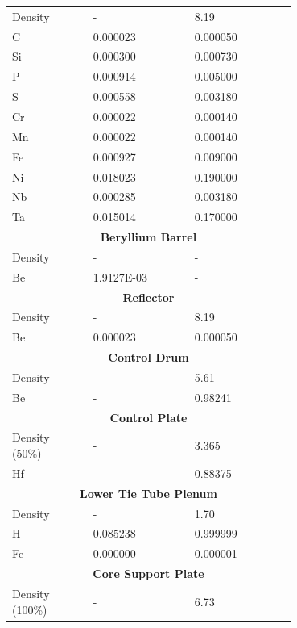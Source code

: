 \documentclass[8pt,a5paper]{article}
\begin{document}
\begin{longtable}{|m{0.2\linewidth}|m{0.25\linewidth}|m{0.25\linewidth}|}
    \hline
    \endlastfoot
    \multicolumn{3}{|c|}{\textbf{Steel Wrapper (SS-347)}}\\\hline
    Density & - & \SI{8.19}{} \\
    C & \SI{0.000023}{} & \SI{0.000050}{} \\
    Si & \SI{0.000300}{} & \SI{0.000730}{} \\
    P & \SI{0.000914}{} & \SI{0.005000}{} \\
    S & \SI{0.000558}{} & \SI{0.003180}{} \\
    Cr & \SI{0.000022}{} & \SI{0.000140}{} \\
    Mn & \SI{0.000022}{} & \SI{0.000140}{} \\
    Fe & \SI{0.000927}{} & \SI{0.009000}{} \\
    Ni & \SI{0.018023}{} & \SI{0.190000}{} \\
    Nb & \SI{0.000285}{} & \SI{0.003180}{} \\
    Ta & \SI{0.015014}{} & \SI{0.170000}{} \\\hline
    \multicolumn{3}{|c|}{\textbf{Beryllium Barrel}}\\\hline
    Density & - & - \\
    Be & \SI{1.9127E-03}{}& - \\\hline
    \multicolumn{3}{|c|}{\textbf{Reflector}}\\\hline
    Density & - & \SI{8.19}{} \\
    Be & \SI{0.000023}{} & \SI{0.000050}{} \\\hline
    \multicolumn{3}{|c|}{\textbf{Control Drum}}\\\hline
    Density & - & \SI{5.61}{} \\
    Be & - & \SI{0.98241}{} \\\hline
    \multicolumn{3}{|c|}{\textbf{Control Plate}}\\\hline
    Density (50\%) & - & \SI{3.365}{} \\
    Hf & - & \SI{0.88375}{} \\\hline
    \multicolumn{3}{|c|}{\textbf{Lower Tie Tube Plenum}}\\\hline
    Density & - & \SI{1.70}{} \\
    H & \SI{0.085238}{} & \SI{0.999999}{} \\
    Fe & \SI{0.000000}{} & \SI{0.000001}{} \\\hline
    \multicolumn{3}{|c|}{\textbf{Core Support Plate}}\\\hline
    Density (100\%) & - & \SI{6.73}{} \\

\end{longtable}
\end{document}
